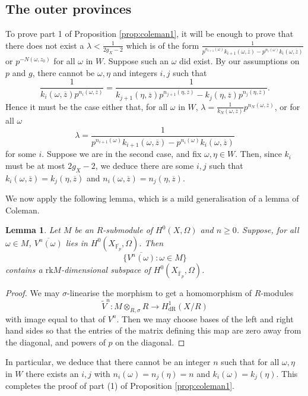 \documentclass[11pt]{amsart}
\newcommand{\dR}{\mathrm{dR}}
\newcommand{\rk}{\mathrm{rk}}
\theoremstyle{plain}
\newtheorem{lemma}{Lemma}
\theoremstyle{definition}
\newcommand{\F}{\mathbb{F}}
\begin{document}
\subsection{The outer provinces}
To prove part 1 of Proposition \ref{prop:coleman1}, it will be enough to prove that there does not exist a $\lambda <\frac{1}{2g_X-2}$ which is of the form $\frac{1}{p^{n_{i+1} (\omega )}k_{i+1}(\omega ,\overline{z})-p^{n_i (\omega )}k_{i}(\omega ,\overline{z})}$ or $p^{-N(\omega ,z_0 )}$ for all $\omega $ in $W$. Suppose such an $\omega $ did exist. By our assumptions on $p$ and $g$, there cannot be $\omega ,\eta$ and integers $i,j$ such that 
\[
\frac{1}{k_i (\omega ,\overline{z} )p^{n_i (\omega ,\overline{z} )}}=\frac{1}{k_{j+1} (\eta ,\overline{z} )p^{n_{j+1} (\eta ,\overline{z} )}-k_{j} (\eta ,\overline{z} )p^{n_{j} (\eta ,\overline{z} )}}.
\]
Hence it must be the case either that, for all $\omega $ in $W$, $\lambda =\frac{1}{k_N (\omega ,\overline{z} )} p^{n_N (\omega ,\overline{z})}$, or for all $\omega $
\[
\lambda =\frac{1}{p^{n_{i+1} (\omega )}k_{i+1}(\omega ,\overline{z})-p^{n_i (\omega )}k_{i}(\omega ,\overline{z})}
\]
for some $i$. Suppose we are in the second case, and fix $\omega ,\eta \in W$. Then, since $k_i $ must be at most $2g_X-2$, we deduce there are some $i,j$ such that
$
k_i (\omega ,\overline{z})=k_j (\eta ,\overline{z})$ and $n_i (\omega ,\overline{z})=n_j (\eta ,\overline{z})$.

We now apply the following lemma, which is a mild generalisation of a lemma of Coleman.
\begin{lemma}\label{lemma:outer}
Let $M$ be an $R$-submodule of $H^0 (X,\Omega )$ and $n\geq 0 $. Suppose, for all $\omega \in M$, $\overline{V^n (\omega )}$ lies in $H^0 (X_{\overline{\F _p }},\Omega )$. Then 
\[
\{ \overline{V^n (\omega )}:\omega \in M \}
\]
contains a $\rk M$-dimensional subspace of $H^0 (X_{\overline{\F }_p },\Omega )$.
\end{lemma}
\begin{proof}
We may $\sigma $-linearise the morphism to get a homomorphism of $R$-modules
\[
\widetilde{V}^n :M\otimes _{R,\sigma }R\to H^1 _{\dR}(X/R)
\]
with image equal to that of $V^n$. Then we may choose bases of the left and right hand sides so that the entries of the matrix defining this map are zero away from the diagonal, and powers of $p$ on the diagonal.
\end{proof}
In particular, we deduce that there cannot be an integer $n$ such that for all $\omega ,\eta $ in $W$ there exists an $i,j$ with $n_i (\omega )=n_j (\eta )=n$ and $k_i (\omega )=k_j (\eta )$. This completes the proof of part (1) of Proposition \ref{prop:coleman1}.
\end{document}
